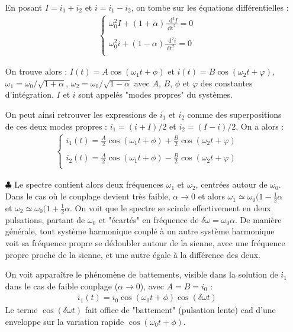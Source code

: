 \documentclass{report}
\newcommand*\dif{\mathop{}\!\mathrm{d}}
\begin{document}
\begin{itemize}
	En posant $I=i_1+i_2$ et $i=i_1-i_2$, on tombe sur les équations différentielles :
	\begin{align*}
	\left\lbrace
	\begin{array}{ccc}
	\omega_0^2I+(1+\alpha)\frac{\dif^2 I}{\mathrm{dt}^2}=0\\
	\\
	\omega_0^2i+(1-\alpha)\frac{\dif^2 i}{\mathrm{dt}^2}=0\\
	\end{array}\right.
	\end{align*}		
	
	On trouve alors : $I(t)=A\cos(\omega_1t+\phi)$ et $i(t)=B\cos(\omega_2t+\varphi)$, $\omega_1=\omega_0/\sqrt{1+\alpha}$, $\omega_2=\omega_0/\sqrt{1-\alpha}$ avec $A$, $B$, $\phi$ et $\varphi$ des constantes d'intégration. $I$ et $i$ sont appelés "modes propres" du systèmes.
	
	On peut ainsi retrouver les expressions de $i_1$ et $i_2$ comme des superpositions de ces deux modes propres : $i_1=(i+I)/2$ et $i_2=(I-i)/2$. On a alors :
		\begin{align*}
	\left\lbrace
	\begin{array}{ccc}
	i_1(t)=\frac{A}{2}\cos(\omega_1t+\phi)+\frac{B}{2}\cos(\omega_2t+\varphi)\\
	\\
	i_2(t)=\frac{A}{2}\cos(\omega_1t+\phi)-\frac{B}{2}\cos(\omega_2t+\varphi)\\
	\end{array}\right.
	\end{align*}		
	
	\item[$\clubsuit$] Le spectre contient alors deux fréquences $\omega_1$ et $\omega_2$, centrées autour de $\omega_0$. Dans le cas où le couplage devient très faible, $\alpha\longrightarrow0$ et alors $\omega_1\simeq\omega_0(1-\frac{1}{2}\alpha$ et $\omega_2\simeq\omega_0(1+\frac{1}{2}\alpha$. On voit que le spectre se scinde effectivement en deux pulsations, partant de $\omega_0$ et "écartés" en fréquence de $\delta\omega=\omega_0\alpha$. De manière générale, tout système harmonique couplé à un autre système harmonique voit sa fréquence propre se dédoubler autour de la sienne, avec une fréquence propre proche de la sienne, et une autre égale à la différence des deux. 
	
	On voit apparaître le phénomène de battements, visible dans la solution de $i_1$ dans le cas de faible couplage ($\alpha\longrightarrow0$), avec $A=B=i_0$ :
	\begin{align*}
		i_1(t)=i_0\cos(\omega_0t+\phi)\cos(\delta\omega t)
	\end{align*}
	Le terme $\cos(\delta\omega t)$ fait office de "battement" (pulsation lente) cad d'une enveloppe sur la variation rapide $\cos(\omega_0t+\phi)$.
	

\end{itemize}
\end{document}
